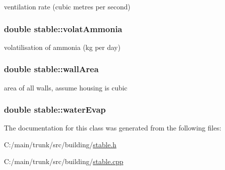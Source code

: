 ventilation rate (cubic metres per second) \hypertarget{classstable_a1f0ac889ae9a48dc82e55e3a98ae233b}{
\subsubsection[{volatAmmonia}]{\setlength{\rightskip}{0pt plus 5cm}double {\bf stable::volatAmmonia}}}
\label{classstable_a1f0ac889ae9a48dc82e55e3a98ae233b}


volatilisation of ammonia (kg per day) \hypertarget{classstable_ab03af3bbdccbf2ce7f505756133c39d6}{
\subsubsection[{wallArea}]{\setlength{\rightskip}{0pt plus 5cm}double {\bf stable::wallArea}}}
\label{classstable_ab03af3bbdccbf2ce7f505756133c39d6}


area of all walls, assume housing is cubic \hypertarget{classstable_a07f66a7a6e1bc573583fe29c2b3e1855}{
\subsubsection[{waterEvap}]{\setlength{\rightskip}{0pt plus 5cm}double {\bf stable::waterEvap}}}
\label{classstable_a07f66a7a6e1bc573583fe29c2b3e1855}


The documentation for this class was generated from the following files:\begin{DoxyCompactItemize}
\item 
C:/main/trunk/src/building/\hyperlink{stable_8h}{stable.h}\item 
C:/main/trunk/src/building/\hyperlink{stable_8cpp}{stable.cpp}\end{DoxyCompactItemize}
